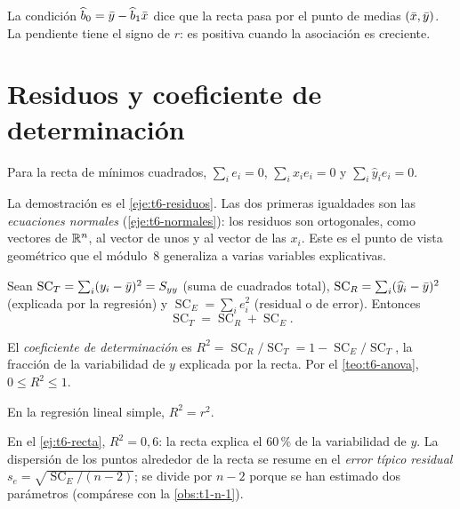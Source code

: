 La condición $\widehat b_0=\bar{y}-\widehat b_1\bar{x}$ dice que la recta pasa por el punto de medias $(\bar{x},\bar{y})$. La pendiente tiene el signo de $r$: es positiva cuando la asociación es creciente.

\addtocounter{definicion}{1}%

\addtocounter{figure}{1}%

\section{Residuos y coeficiente de determinación}

\begin{proposicion}\label{prop:t6-residuos}
Para la recta de mínimos cuadrados, $\sum_ie_i=0$, $\sum_ix_ie_i=0$ y $\sum_i\widehat y_ie_i=0$.
\end{proposicion}

La demostración es el \cref{eje:t6-residuos}. Las dos primeras igualdades son las \emph{ecuaciones normales} (\cref{eje:t6-normales}): los residuos son ortogonales, como vectores de $\mathbb{R}^{n}$, al vector de unos y al vector de las $x_i$. Este es el punto de vista geométrico que el módulo~8 generaliza a varias variables explicativas.

\begin{teorema}\label{teo:t6-anova}
Sean $\operatorname{SC}_T=\sum_i(y_i-\bar{y})^{2}=S_{yy}$ (suma de cuadrados total), $\operatorname{SC}_R=\sum_i(\widehat y_i-\bar{y})^{2}$ (explicada por la regresión) y $\operatorname{SC}_E=\sum_ie_i^{2}$ (residual o de error). Entonces
\[
\operatorname{SC}_T=\operatorname{SC}_R+\operatorname{SC}_E.
\]
\end{teorema}

\begin{definicion}\label{def:t6-r2}
El \emph{coeficiente de determinación} es $R^{2}=\operatorname{SC}_R/\operatorname{SC}_T=1-\operatorname{SC}_E/\operatorname{SC}_T$, la fracción de la variabilidad de $y$ explicada por la recta. Por el \cref{teo:t6-anova}, $0\le R^{2}\le1$.
\end{definicion}

\begin{corolario}\label{cor:t6-r2}
En la regresión lineal simple, $R^{2}=r^{2}$.
\end{corolario}

En el \cref{ej:t6-recta}, $R^{2}=0{,}6$: la recta explica el $60\,\%$ de la variabilidad de $y$. La dispersión de los puntos alrededor de la recta se resume en el \emph{error típico residual} $s_e=\sqrt{\operatorname{SC}_E/(n-2)}$; se divide por $n-2$ porque se han estimado dos parámetros (compárese con la \cref{obs:t1-n-1}).

